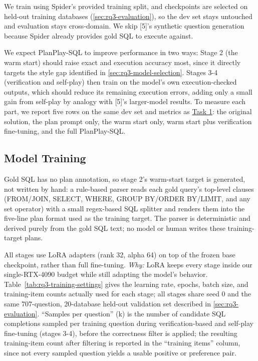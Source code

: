 We train using Spider's provided training split, and checkpoints are selected on held-out training databases (\ref{sec:rq3-evaluation}), so the dev set stays untouched and evaluation stays cross-domain. We skip [5]'s synthetic question generation because Spider already provides gold SQL to execute against.

We expect PlanPlay-SQL to improve performance in two ways: Stage 2 (the warm start) should raise exact and execution accuracy most, since it directly targets the style gap identified in \ref{sec:rq3-model-selection}. Stages 3-4 (verification and self-play) then train on the model's own execution-checked outputs, which should reduce its remaining execution errors, adding only a small gain from self-play by analogy with [5]'s larger-model results. To measure each part, we report five rows on the same dev set and metrics as \hyperref[sec:rq1-results]{Task 1}: the original solution, the plan prompt only, the warm start only, warm start plus verification fine-tuning, and the full PlanPlay-SQL.

\subsection{Model Training}
\label{sec:rq3-training}

Gold SQL has no plan annotation, so stage 2's warm-start target is generated, not written by hand: a rule-based parser reads each gold query's top-level clauses (FROM/JOIN, SELECT, WHERE, GROUP BY/ORDER BY/LIMIT, and any set operator) with a small regex-based SQL splitter and renders them into the five-line plan format used as the training target. The parser is deterministic and derived purely from the gold SQL text; no model or human writes these training-target plans.

All stages use LoRA adapters (rank 32, alpha 64) on top of the frozen base checkpoint, rather than full fine-tuning. \emph{Why:} LoRA keeps every stage inside our single-RTX-4090 budget while still adapting the model's behavior. Table~\ref{tab:rq3-training-settings} gives the learning rate, epochs, batch size, and training-item counts actually used for each stage; all stages share seed 0 and the same 707-question, 20-database held-out validation set described in \ref{sec:rq3-evaluation}. ``Samples per question'' (k) is the number of candidate SQL completions sampled per training question during verification-based and self-play fine-tuning (stages 3-4), before the correctness filter is applied; the resulting training-item count after filtering is reported in the ``training items'' column, since not every sampled question yields a usable positive or preference pair.

